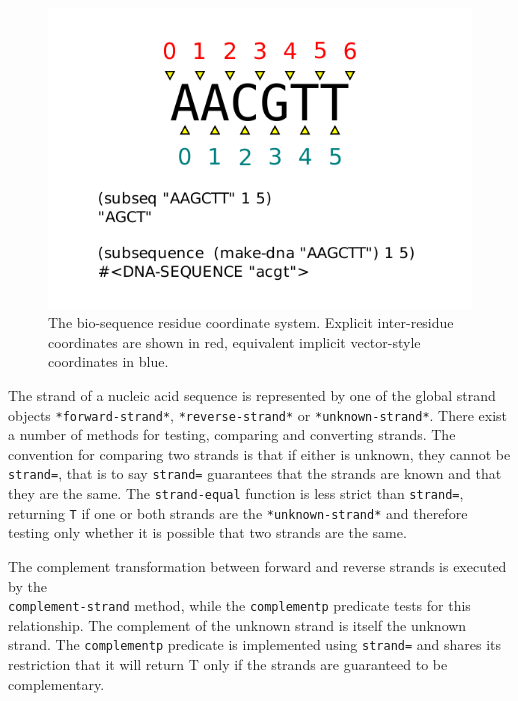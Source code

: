 \documentclass[a4paper, 12pt]{article}
\begin{document}
\begin{figure}[tbph]
  \begin{center}
    \includegraphics[scale=1.0]{inter-residue-coordinates.pdf}
  \end{center}
  \caption{The bio-sequence residue coordinate system. Explicit
    inter-residue coordinates are shown in red, equivalent implicit
    vector-style coordinates in blue.}
  \label{fig:inter-residue-coords}
\end{figure}

The strand of a nucleic acid sequence is represented by one of the
global strand objects \lstinline!*forward-strand*!,
\lstinline!*reverse-strand*! or \lstinline!*unknown-strand*!. There
exist a number of methods for testing, comparing and converting
strands. The convention for comparing two strands is that if either is
unknown, they cannot be \lstinline!strand=!, that is to say
\lstinline!strand=! guarantees that the strands are known and that
they are the same. The \lstinline!strand-equal! function is less
strict than \lstinline!strand=!, returning \lstinline!T! if one or
both strands are the \lstinline!*unknown-strand*! and therefore
testing only whether it is possible that two strands are the same.

The complement transformation between forward and reverse strands is
executed by the \\ \lstinline!complement-strand! method, while the
\lstinline!complementp! predicate tests for this relationship. The
complement of the unknown strand is itself the unknown strand. The
\lstinline!complementp! predicate is implemented using
\lstinline!strand=! and shares its restriction that it will return T
only if the strands are guaranteed to be complementary.
\end{document}
